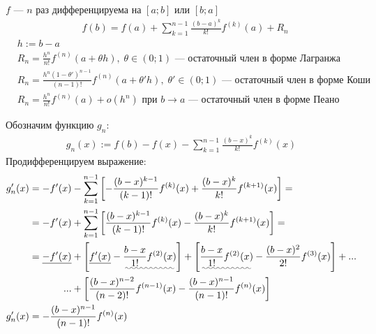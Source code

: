 \documentclass{article}
\begin{document}

\theorem[Тейлора]

$f$ --- $n$ раз дифференцируема на $[a;b]$ или $[b;a]$
\begin{align*}
	 & f(b)=f(a)+\sum_{k=1}^{n-1}\frac{(b-a)^{k}}{k!}f^{(k)}(a)+R_n
\end{align*}
\begin{align*}
	 & h:=b-a                                                                                                                  \\
	 & R_n=\frac{h^n}{n!}f^{(n)}(a+\theta h),\;\theta\in(0;1)\text{ --- остаточный член в форме Лагранжа }                     \\
	 & R_n=\frac{h^{n}(1-\theta')^{n-1}}{(n-1)!}f^{(n)}(a+\theta'h),\;\theta'\in(0;1)\text{ --- остаточный член в форме Коши } \\
	 & R_n=\frac{h^{n}}{n!}f^{(n)}(a)+o(h^{n})\text{ при $b\to a$ --- остаточный член в форме Пеано }
\end{align*}

\proof

Обозначим функцию $g_n$:
\begin{align*}
	g_n(x):=f(b)-f(x)-\sum_{k=1}^{n-1}\frac{(b-x)^{k}}{k!}f^{(k)}(x)
\end{align*}
Продифференцируем выражение:
\begin{align*}
	g_n'(x)
	 & =-f'(x)-\sum_{k=1}^{n-1}\left[-\frac{(b-x)^{k-1}}{(k-1)!}f^{(k)}(x)+\frac{(b-x)^{k}}{k!}f^{(k+1)}(x)\right]=                                                                                                                          \\
	 & =-f'(x)+\sum_{k=1}^{n-1}\left[\frac{(b-x)^{k-1}}{(k-1)!}f^{(k)}(x)-\frac{(b-x)^{k}}{k!}f^{(k+1)}(x)\right]=                                                                                                                           \\
	 & =
	\begin{aligned}[t]
		\underline{-f'(x)} & +\left[\underline{f'(x)}-\uwave{\frac{b-x}{1!}f^{(2)}(x)}\right]+\left[\uwave{\frac{b-x}{1!}f^{(2)}(x)}-\frac{(b-x)^{2}}{2!}f^{(3)}(x)\right]+... \\
		...                & +\left[\frac{(b-x)^{n-2}}{(n-2)!}f^{(n-1)}(x)-\frac{(b-x)^{n-1}}{(n-1)!}f^{(n)}(x)\right]
	\end{aligned} \\
	g_n'(x)
	 & =-\frac{(b-x)^{n-1}}{(n-1)!}f^{(n)}(x)
\end{align*}
\end{document}
